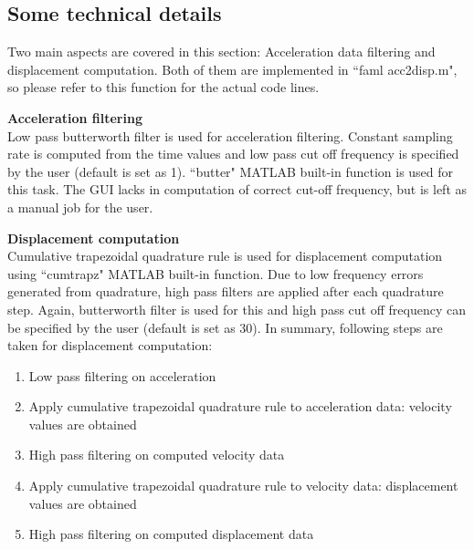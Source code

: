 \documentclass[12pt]{article}
\begin{document}
\subsection{Some technical details}\label{fdetails}
Two main aspects are covered in this section: Acceleration data filtering and
displacement computation. Both of them are implemented in ``faml\textunderscore
acc2disp.m", so please refer to this function for the actual code lines.
\newline

\noindent \textbf{Acceleration filtering}\\

\noindent Low pass butterworth filter is used for acceleration filtering. Constant
sampling rate is computed from the time values and low pass cut off frequency
is specified by the user (default is set as 1). ``butter" MATLAB built-in
function is used for this task. The GUI lacks in computation of correct cut-off
frequency, but is left as a manual job for the user.
\newline

\noindent \textbf{Displacement computation}\\

\noindent Cumulative trapezoidal quadrature rule is used for displacement computation using ``cumtrapz" MATLAB built-in function. Due to low frequency errors generated from quadrature, high pass filters are applied after each quadrature step. Again, butterworth filter is used for this and high pass cut off frequency can be specified by the user (default is set as 30). In summary, following steps are taken for displacement computation:

    \begin{enumerate}

        \item   Low pass filtering on acceleration
    
        \item   Apply cumulative trapezoidal quadrature rule to acceleration data: velocity values are obtained

        \item   High pass filtering on computed velocity data

        \item   Apply cumulative trapezoidal quadrature rule to velocity data: displacement values are obtained

        \item   High pass filtering on computed displacement data

    \end{enumerate}

%
%
\end{document}
